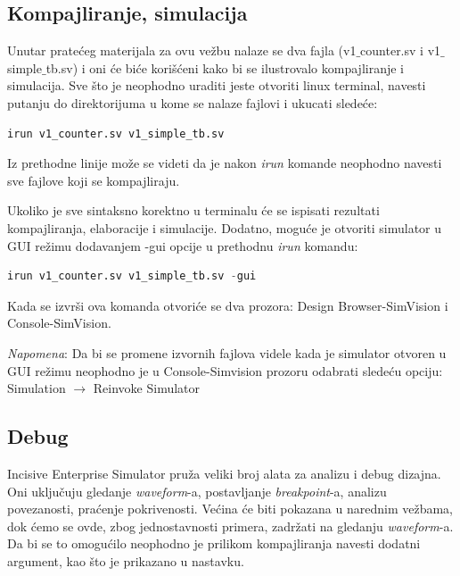 
\subsection{Kompajliranje, simulacija}

Unutar pratećeg materijala za ovu vežbu nalaze se dva fajla (v1\(\_\)counter.sv i v1\(\_\)simple\(\_\)tb.sv)
i oni će biće korišćeni kako bi se ilustrovalo kompajliranje i simulacija. Sve što je neophodno uraditi
jeste otvoriti linux terminal, navesti putanju do direktorijuma u kome se nalaze fajlovi i ukucati sledeće:

\begin{lstlisting}[language=Python]
irun v1_counter.sv v1_simple_tb.sv 
\end{lstlisting}


Iz prethodne linije može se videti da je nakon \emph{irun} komande neophodno navesti
sve fajlove koji se kompajliraju. 

Ukoliko je sve sintaksno korektno u terminalu će se ispisati rezultati
kompajliranja, elaboracije i simulacije. Dodatno, moguće je otvoriti simulator u GUI režimu
dodavanjem -gui opcije u prethodnu \emph{irun} komandu:

\begin{lstlisting}[language=Python]
irun v1_counter.sv v1_simple_tb.sv -gui
\end{lstlisting}

Kada se izvrši ova komanda otvoriće se dva prozora: Design Browser-SimVision i Console-SimVision.

\emph{Napomena}: Da bi se promene izvornih fajlova videle kada je simulator otvoren u GUI režimu neophodno
je u Console-Simvision prozoru odabrati sledeću opciju: Simulation \(\rightarrow\) Reinvoke Simulator

\subsection{Debug}

Incisive Enterprise Simulator pruža veliki broj alata za analizu i debug dizajna.
Oni uključuju gledanje \emph{waveform}-a, postavljanje \emph{breakpoint}-a,
analizu povezanosti, praćenje pokrivenosti.
Većina će biti pokazana u narednim vežbama, dok ćemo se ovde, zbog
jednostavnosti primera, zadržati na gledanju \emph{waveform}-a.\\
Da bi se to omogućilo neophodno je prilikom kompajliranja navesti dodatni argument, kao što je
prikazano u nastavku.

